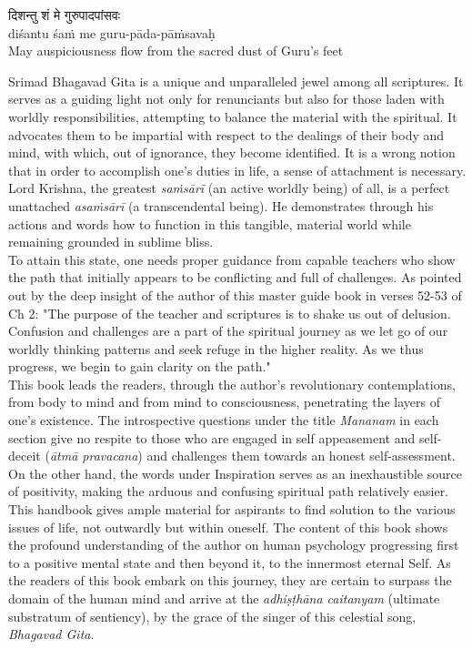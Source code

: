 \begin{center}
{\large\devfont दिशन्तु शं मे गुरुपादपांसवः}\\
{\footnotesize diśantu śaṁ me guru-pāda-pāṁsavaḥ}\\
{\footnotesize May auspiciousness flow from the sacred dust of Guru’s feet}
\end{center}

{\small\mfontCalibri
Srimad Bhagavad Gita is a unique and unparalleled jewel among all scriptures. It serves as a guiding light not only for renunciants but also for those laden with worldly responsibilities, attempting to balance the material with the spiritual. It advocates them to be impartial with respect to the dealings of their body and mind, with which, out of ignorance, they become identified. It is a wrong notion that in order to accomplish one's duties in life, a sense of attachment is necessary. Lord Krishna, the greatest \emph{saṁsārī} (an active worldly being) of all, is a perfect unattached \emph{asaṁsārī} (a transcendental being). He demonstrates through his actions and words how to function in this tangible, material world while remaining grounded in sublime bliss.\\


To attain this state, one needs proper guidance from capable teachers who show the path that initially appears to be conflicting and full of challenges. As pointed out by the deep insight of the author of this master guide book  in verses 52-53 of Ch 2:
"The purpose of the teacher and scriptures is to shake us out of delusion. Confusion and challenges are a part of the spiritual journey as we let go of our worldly thinking patterns and seek refuge in the higher reality. As we thus progress, we begin to gain clarity on the path."\\


This book leads the readers, through the author's revolutionary contemplations, from body to mind and from mind to consciousness, penetrating the layers of one's existence. The introspective questions under the title \emph{Mananam} in each section give no respite to those who are engaged in self appeasement and self-deceit (\emph{ātmā pravacana}) and challenges them towards an honest self-assessment. On the other hand, the words under Inspiration serves as an inexhaustible source of positivity, making the arduous and confusing spiritual path relatively easier.\\


This handbook gives ample material for aspirants to find solution to the various issues of life, not outwardly but within oneself. The content of this book shows the profound understanding of the author on human psychology \textemdash\enspace progressing first to a positive mental state and then beyond it, to the innermost eternal Self. As the readers of this book embark on this journey, they are certain to surpass the domain of the human mind and arrive at the \emph{adhiṣṭhāna caitanyam} (ultimate substratum of sentiency), by the grace of the singer of this celestial song, \emph{Bhagavad Gita}.\\


}
